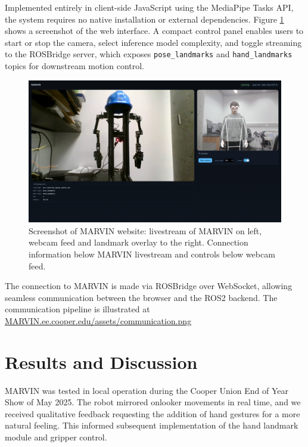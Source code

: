 \documentclass[acmsmall, screen]{acmart}
\begin{document}
Implemented entirely in client-side JavaScript using the MediaPipe Tasks API, the system requires no native installation or external dependencies. Figure \ref{fig:web} shows a screenshot of the web interface. A compact control panel enables users to start or stop the camera, select inference model complexity, and toggle streaming to the ROSBridge server, which exposes \texttt{pose\_landmarks} and \texttt{hand\_landmarks} topics for downstream motion control.

\begin{figure}[tbp]
  \centering
  \includegraphics[width=.8\linewidth]{assets/web} %
  \caption{Screenshot of MARVIN website: livestream of MARVIN on left, webcam feed and landmark overlay to the right. Connection information below MARVIN livestream and controls below webcam feed.}
  \label{fig:web}
\end{figure}

The connection to MARVIN is made via ROSBridge over WebSocket, allowing seamless communication between the browser and the ROS2 backend. 
The communication pipeline is illustrated at \url{MARVIN.ee.cooper.edu/assets/communication.png}


\section{Results and Discussion}
MARVIN was tested in local operation during the Cooper Union End of Year Show of May 2025. The robot mirrored onlooker movements in real time, and we received qualitative feedback requesting the addition of hand gestures for a more natural feeling. This informed subsequent implementation of the hand landmark module and gripper control. 
\end{document}
